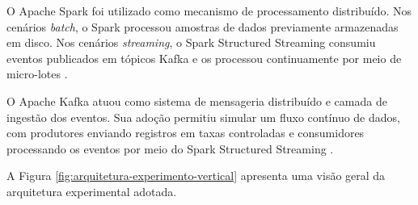 O Apache Spark foi utilizado como mecanismo de processamento distribuído. Nos cenários \textit{batch}, o Spark processou amostras de dados previamente armazenadas em disco. Nos cenários \textit{streaming}, o Spark Structured Streaming consumiu eventos publicados em tópicos Kafka e os processou continuamente por meio de micro-lotes \cite{armbrust2018structured,zaharia2016apache}.
 
O Apache Kafka atuou como sistema de mensageria distribuído e camada de ingestão dos eventos. Sua adoção permitiu simular um fluxo contínuo de dados, com produtores enviando registros em taxas controladas e consumidores processando os eventos por meio do Spark Structured Streaming \cite{kreps2011kafka}.
 
A Figura \ref{fig:arquitetura-experimento-vertical} apresenta uma visão geral da arquitetura experimental adotada.
 
